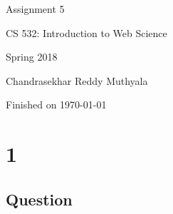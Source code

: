 \documentclass[letterpaper,11pt]{article}
\begin{document}
\begin{titlepage}

\begin{center}

\Huge{Assignment 5}

\Large{CS 532:  Introduction to Web Science}

\Large{Spring 2018}

\Large{Chandrasekhar Reddy Muthyala}

\Large Finished on \today

\end{center}

\end{titlepage}

\newpage


\section*{1}

\subsection*{Question}
\end{document}

